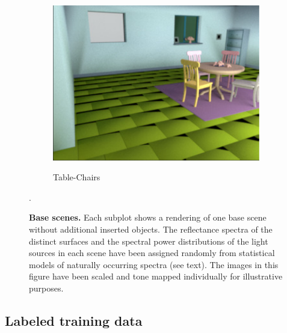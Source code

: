 \documentclass{jov}
\begin{document}
\begin{figure}
\begin{subfigure}[b]{0.22 \textwidth}
        \caption{Table-Chairs}    
        \includegraphics[width=\textwidth]{../FiguresDraft5/Figure2/Figure2_c.pdf}
        \label{fig:baseSceneTableChairs}
    \end{subfigure}
    \caption{{\bf Base scenes.} Each subplot shows a rendering of one base scene without additional inserted objects.  The reflectance spectra of the distinct surfaces and the spectral power distributions of the light sources in each scene have been assigned randomly from statistical models of naturally occurring spectra (see text). The images in this figure have been scaled and tone mapped individually for illustrative purposes.}
\label{fig:baseScenes}. \end{figure}

\subsection{Labeled training data} \label{method:VirtualWorld}
\end{document}

